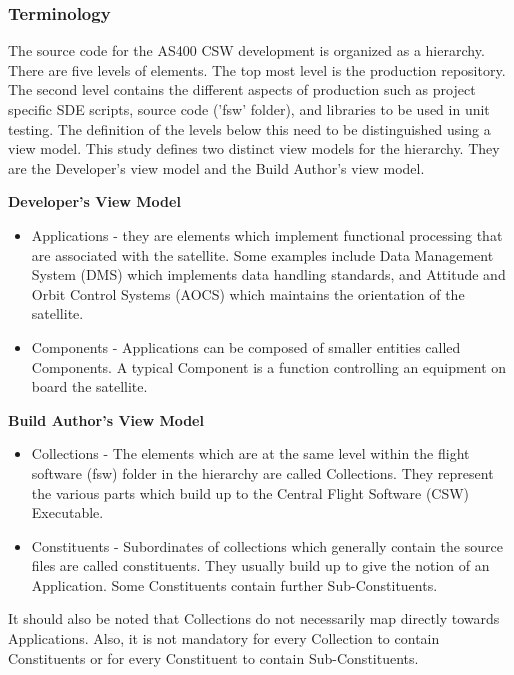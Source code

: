 \documentclass[12pt, a4paper, titlepage]{scrartcl}
\begin{document}
\subsubsection{Terminology}
The source code for the AS400 CSW development is organized as a hierarchy. There are five levels of elements. The top most level is the production repository. The second level contains the different aspects of production such as project specific SDE scripts, source code ('fsw' folder), and libraries to be used in unit testing. The definition of the levels below this need to be distinguished using a view model. This study defines two distinct view models\cite{finkelstein1992viewpoints} for the hierarchy. They are the Developer's view model and the Build Author's view model.
\par \textbf{Developer's View Model}
\begin{itemize}
	\item Applications - they are elements which implement functional processing that are associated with the satellite. Some examples include Data Management System (DMS) which implements data handling standards, and Attitude and Orbit Control Systems (AOCS) which maintains the orientation of the satellite.
	\item Components - Applications can be composed of smaller entities called Components. A typical Component is a function controlling an equipment on board the satellite. 
\end{itemize}
\textbf{Build Author's View Model}
\begin{itemize}
	\item Collections - The elements which are at the same level within the flight software (fsw) folder in the hierarchy are called Collections. They represent the various parts which build up to the Central Flight Software (CSW) Executable.
	\item Constituents - Subordinates of collections which generally contain the source files are called constituents. They usually build up to give the notion of an Application. Some Constituents contain further Sub-Constituents.
\end{itemize}
It should also be noted that Collections do not necessarily map directly towards Applications. Also, it is not mandatory for every Collection to contain Constituents or for every Constituent to contain Sub-Constituents. 
\end{document}
